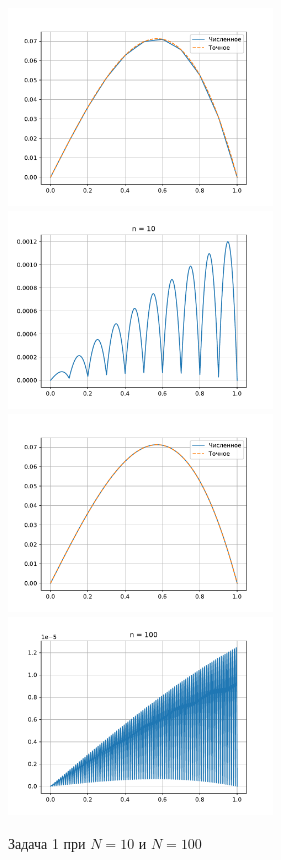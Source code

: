 \begin{figure}[H]
    \centering
    \includegraphics[width=7cm]{pictures/plot1_10.pdf}
    \includegraphics[width=7cm]{pictures/diff1_10.pdf}
    \includegraphics[width=7cm]{pictures/plot1_100.pdf}
    \includegraphics[width=7cm]{pictures/diff1_100.pdf}
    \caption{Задача 1 при \(N = 10\) и \(N = 100\)}\label{z1p}
\end{figure}

